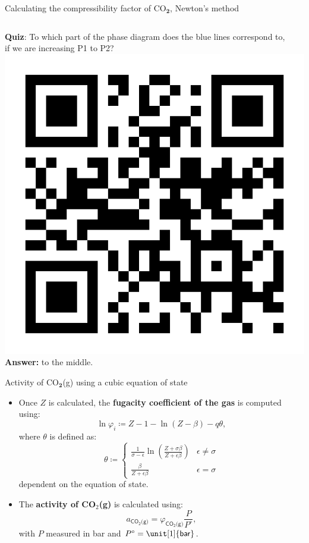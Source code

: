 \begin{frame}{Calculating the compressibility factor of CO$_{\boldsymbol{2}}$, Newton's method}
\begin{columns}[t]
\end{columns}

\pause
\alert{\textbf{Quiz}}: To which part of the phase diagram does the blue lines correspond to, \\ 
if we are increasing P1 to P2?
\vskip -30pt
\includegraphics[height=0.12\columnwidth, right]{figures/activity-models/poll-ionic-strength.png}
\hiddenpause
\vskip -20pt
\textbf{Answer:} to the middle. 
\end{frame}
%
%
\begin{frame}{Activity of CO$_{\boldsymbol{2}}$(g) using a cubic equation of state}
\begin{itemize}
\item Once $Z$ is calculated, the \alert{\textbf{fugacity coefficient of the gas}} is computed
using:
\[
\boxed{\ln\varphi_{i}\coloneqq Z-1-\ln(Z-\beta)-q\theta},
\]
where $\theta$ is defined as:\[
\theta\coloneqq\begin{cases}
{\displaystyle \frac{1}{\sigma-\epsilon}\ln\left(\frac{Z+\sigma\beta}{Z+\epsilon\beta}\right)} & \epsilon\neq\sigma\\
{\displaystyle \frac{\beta}{Z+\epsilon\beta}} & \epsilon=\sigma
\end{cases}
\]
dependent on the equation of state.
\item The \alert{\textbf{activity of CO$_{2}$(g)}} is calculated using:
\[
a_{\mathsf{CO_{2}\text{(g)}}}=\varphi_{\mathsf{CO_{2}\text{(g)}}}\frac{P}{P^{\circ}},
\]
with $P$ measured in bar and $P^{\circ}=\unit[1]{\mathsf{bar}}$.
\end{itemize}
\end{frame}
%
%
